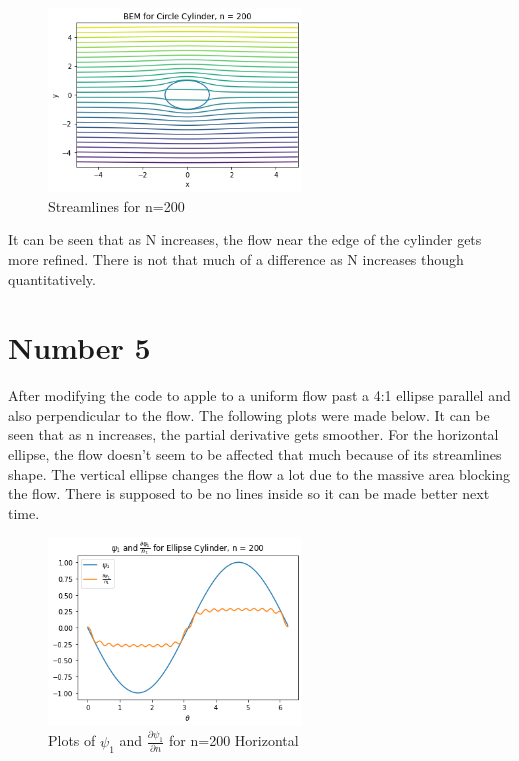 \documentclass{article}
\begin{document}
		\begin{figure}[H]
			\centering
			\includegraphics[width=0.6\textwidth]{images/c200.png}
			\caption{ Streamlines for n=200}
		\end{figure}
	
		It can be seen that as N increases, the flow near the edge of the cylinder gets more refined. There is not that much of a difference as N increases though quantitatively.

		
	\section*{Number 5}
		After modifying the code to apple to a uniform flow past a 4:1 ellipse parallel and also perpendicular to the flow. The following plots were made below. It can be seen that as n increases, the partial derivative gets smoother. For the horizontal ellipse, the flow doesn't seem to be affected that much because of its streamlines shape. The vertical ellipse changes the flow a lot due to the massive area blocking the flow. There is supposed to be no lines inside so it can be made better next time. 
		
		\begin{figure}[H]
			\centering
			\includegraphics[width=0.6\textwidth]{images/el2001.png}
			\caption{ Plots of $\psi_1$ and $\frac{\partial \psi_1}{\partial n}$ for n=200 Horizontal}
		\end{figure}
	
\end{document}
